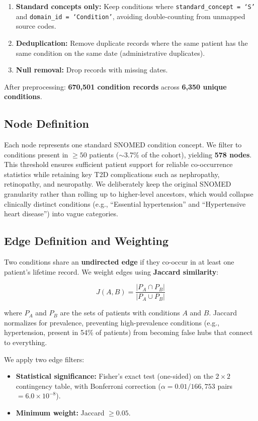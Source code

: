 \documentclass[10pt,twocolumn]{article}
\begin{document}
\begin{enumerate}
    \item \textbf{Standard concepts only:} Keep conditions where \texttt{standard\_concept = `S'} and \texttt{domain\_id = `Condition'}, avoiding double-counting from unmapped source codes.
    \item \textbf{Deduplication:} Remove duplicate records where the same patient has the same condition on the same date (administrative duplicates).
    \item \textbf{Null removal:} Drop records with missing dates.
\end{enumerate}

After preprocessing: \textbf{670,501 condition records} across \textbf{6,350 unique conditions}.

\subsection{Node Definition}

Each node represents one standard SNOMED condition concept.
We filter to conditions present in $\geq 50$ patients ($\sim$3.7\% of the cohort), yielding \textbf{578 nodes}.
This threshold ensures sufficient patient support for reliable co-occurrence statistics while retaining key T2D complications such as nephropathy, retinopathy, and neuropathy.
We deliberately keep the original SNOMED granularity rather than rolling up to higher-level ancestors, which would collapse clinically distinct conditions (e.g., ``Essential hypertension'' and ``Hypertensive heart disease'') into vague categories.

\subsection{Edge Definition and Weighting}

Two conditions share an \textbf{undirected edge} if they co-occur in at least one patient's lifetime record.
We weight edges using \textbf{Jaccard similarity}:

\[
J(A, B) = \frac{|P_A \cap P_B|}{|P_A \cup P_B|}
\]

where $P_A$ and $P_B$ are the sets of patients with conditions $A$ and $B$.
Jaccard normalizes for prevalence, preventing high-prevalence conditions (e.g., hypertension, present in 54\% of patients) from becoming false hubs that connect to everything.

We apply two edge filters:
\begin{itemize}
    \item \textbf{Statistical significance:} Fisher's exact test (one-sided) on the $2 \times 2$ contingency table, with Bonferroni correction ($\alpha = 0.01 / 166{,}753$ pairs $= 6.0 \times 10^{-8}$).
    \item \textbf{Minimum weight:} Jaccard $\geq 0.05$.
\end{itemize}
\end{document}
